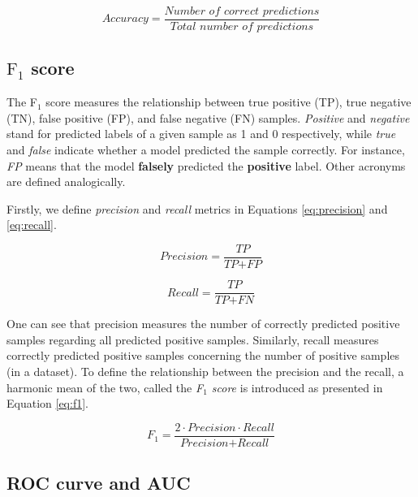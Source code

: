 \documentclass[a4paper, 11pt, twoside]{report}
\theoremstyle{definition}
\begin{document}
\begin{equation}
    \textit{Accuracy} = \frac{\textit{Number of correct predictions}}{\textit{Total number of predictions}} \label{eq:accuracy}
\end{equation}

\subsection{\texorpdfstring{$\text{F}_1$}{F1} score}

The F$_1$ score measures the relationship between true positive (TP), true negative (TN), false positive (FP), and false negative (FN) samples. \textit{Positive} and \textit{negative} stand for predicted labels of a given sample as 1 and 0 respectively, while \textit{true} and \textit{false} indicate whether a model predicted the sample correctly. For instance, \textit{FP} means that the model \textbf{falsely} predicted the \textbf{positive} label. Other acronyms are defined analogically. \par
Firstly, we define \textit{precision} and \textit{recall} metrics in Equations \ref{eq:precision} and \ref{eq:recall}. \par

\begin{equation}
    \textit{Precision} = \frac{\textit{TP}}{\textit{TP} + \textit{FP}}
    \label{eq:precision}
\end{equation}

\begin{equation}
    \textit{Recall} = \frac{\textit{TP}}{\textit{TP} + \textit{FN}}
    \label{eq:recall}
\end{equation}

One can see that precision measures the number of correctly predicted positive samples regarding all predicted positive samples. Similarly, recall measures correctly predicted positive samples concerning the number of positive samples (in a dataset). To define the relationship between the precision and the recall, a harmonic mean of the two, called the \textit{F$_1$ score} is introduced as presented in Equation \ref{eq:f1}. \par

\begin{equation}
    \textit{F}_1 = \frac{2 \cdot \textit{Precision} \cdot \textit{Recall}}{\textit{Precision} + \textit{Recall}}
    \label{eq:f1}
\end{equation}


\subsection{ROC curve and AUC}
\end{document}
